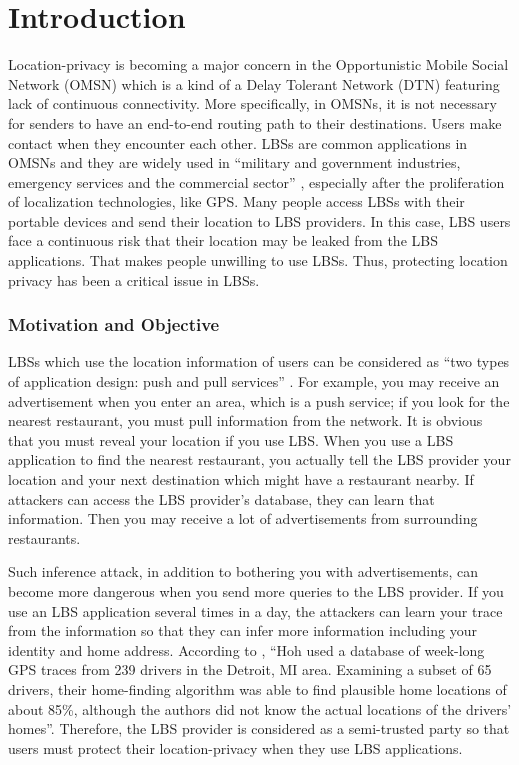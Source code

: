 \chapter {Introduction}
\label{INTRO}
\noindent Location-privacy is becoming a major concern in the Opportunistic Mobile Social Network (OMSN) which is a kind of a Delay Tolerant Network (DTN) \cite {C1} featuring lack of continuous connectivity. More specifically, in OMSNs, it is not necessary for senders to have an end-to-end routing path to their destinations. Users make contact when they encounter each other. LBSs are common applications in OMSNs and they are widely used in ``military and government industries, emergency services and the commercial sector'' \cite {C4}, especially after the proliferation of localization technologies, like GPS. Many people access LBSs with their portable devices and send their location to LBS providers. In this case, LBS users face a continuous risk that their location may be leaked from the LBS applications. That makes people unwilling to use LBSs. Thus, protecting location privacy has been a critical issue in LBSs.


\subsection{ Motivation and Objective}

\noindent LBSs which use the location information of users can be considered as ``two types of application design: push and pull services'' \cite {C4}. For example, you may receive an advertisement when you enter an area, which is a push service; if you look for the nearest restaurant, you must pull information from the network. It is obvious that you must reveal your location if you use LBS. When you use a LBS application to find the nearest restaurant, you actually tell the LBS provider your location and your next destination which might have a restaurant nearby. If attackers can access the LBS provider's database, they can learn that information. Then you may receive a lot of advertisements from surrounding restaurants.

Such inference attack, in addition to bothering you with advertisements, can become more dangerous when you send more queries to the LBS provider. If you use an LBS application several times in a day, the attackers can learn your trace from the information so that they can infer more information including your identity and home address. According to \cite {C5}, ``Hoh used a database of week-long GPS traces from 239 drivers in the Detroit, MI area. Examining a subset of 65 drivers, their home-finding algorithm was able to find plausible home locations of about 85\%, although the authors did not know the actual locations of the drivers' homes''. Therefore, the LBS provider is considered as a semi-trusted party so that users must protect their location-privacy when they use LBS applications.

